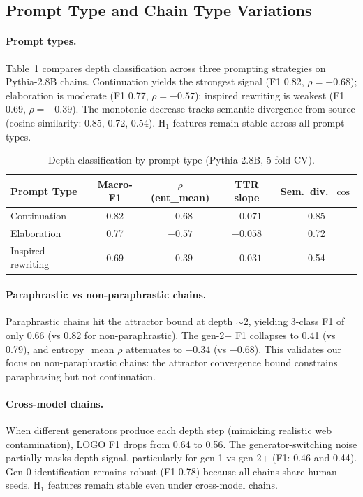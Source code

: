 \documentclass[letterpaper]{article}
\begin{document}
\subsection{Prompt Type and Chain Type Variations}
\label{sec:prompt}

\paragraph{Prompt types.}
Table~\ref{tab:prompt} compares depth classification across three prompting strategies on Pythia-2.8B chains.
Continuation yields the strongest signal (F1 0.82, $\rho{=}-0.68$); elaboration is moderate (F1 0.77, $\rho{=}-0.57$); inspired rewriting is weakest (F1 0.69, $\rho{=}-0.39$).
The monotonic decrease tracks semantic divergence from source (cosine similarity: 0.85, 0.72, 0.54).
H$_1$ features remain stable across all prompt types.

\begin{table}[h]
\centering
\caption{Depth classification by prompt type (Pythia-2.8B, 5-fold CV).}
\label{tab:prompt}
\begin{tabular}{lcccc}
\toprule
Prompt Type & Macro-F1 & $\rho$ (ent\_mean) & TTR slope & Sem.\ div.\ $\cos$ \\
\midrule
Continuation & 0.82 & $-0.68$ & $-0.071$ & 0.85 \\
Elaboration & 0.77 & $-0.57$ & $-0.058$ & 0.72 \\
Inspired rewriting & 0.69 & $-0.39$ & $-0.031$ & 0.54 \\
\bottomrule
\end{tabular}
\end{table}

\paragraph{Paraphrastic vs non-paraphrastic chains.}
\label{sec:paraphrastic}
Paraphrastic chains hit the attractor bound at depth ${\sim}$2, yielding 3-class F1 of only 0.66 (vs 0.82 for non-paraphrastic).
The gen-2+ F1 collapses to 0.41 (vs 0.79), and entropy\_mean $\rho$ attenuates to $-0.34$ (vs $-0.68$).
This validates our focus on non-paraphrastic chains: the attractor convergence bound constrains paraphrasing but not continuation.

\paragraph{Cross-model chains.}
When different generators produce each depth step (mimicking realistic web contamination), LOGO F1 drops from 0.64 to 0.56.
The generator-switching noise partially masks depth signal, particularly for gen-1 vs gen-2+ (F1: 0.46 and 0.44).
Gen-0 identification remains robust (F1 0.78) because all chains share human seeds.
H$_1$ features remain stable even under cross-model chains.
\end{document}
